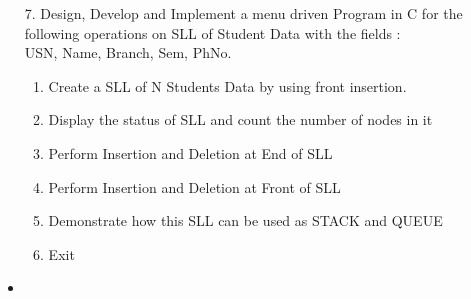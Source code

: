 \documentclass{article}
\newcommand{\answer}{\item [$\rightarrow$]}
\begin{document}
	\begin{itemize}
		\item [7.] Design, Develop and Implement a menu driven Program in C for the following operations on SLL of Student Data with the fields : \\ USN, Name, Branch, Sem, PhNo.
		\begin{enumerate}[label=\alph*.]
			\item Create a SLL of N Students Data by using front insertion.
			\item Display the status of SLL and count the number of nodes in it
			\item Perform Insertion and Deletion at End of SLL
			\item Perform Insertion and Deletion at Front of SLL
			\item Demonstrate how this SLL can be used as STACK and QUEUE
			\item Exit
		\end{enumerate}
		\answer \inputminted{c}{../Program7.c}
	\end{itemize}
\end{document}
